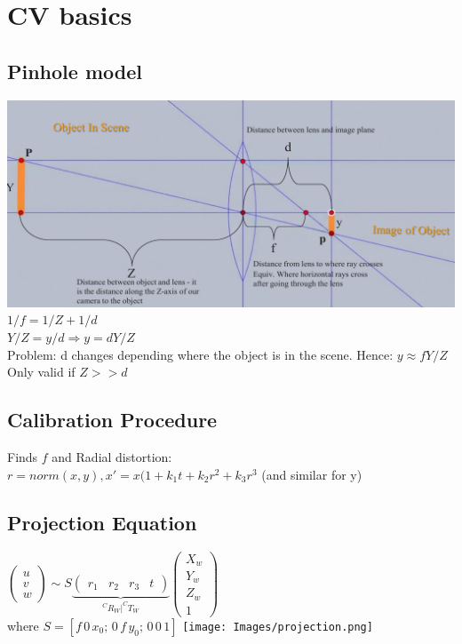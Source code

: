 \section{CV basics}
\subsection*{Pinhole model}
\includegraphics[width=\linewidth]{Images/Pinhole.png}
$1/f = 1/Z + 1/d$ \\
$Y/Z = y/d \Rightarrow y = d Y/Z$\\
Problem: d changes depending where the object is in the scene. Hence:
$y \approx f Y/Z$\\
\alert{Only valid if $Z >> d$}

\subsection*{Calibration Procedure}
Finds $f$ and Radial distortion:\\
$r = norm(x, y), x' = x( 1 + k_1 t + k_2 r^2
+ k_3 r^3$ (and similar for y)

\subsection*{Projection Equation}
$\begin{pmatrix} u\\ v\\ w\end{pmatrix} \sim
S \underbrace{\begin{pmatrix}r_1 & r_2 & r_3 & t \end{pmatrix}}_{^C R_W
| ^C T_W}
\begin{pmatrix} X_w \\ Y_w \\ Z_w \\ 1\end{pmatrix}$ \\
where $S = [f\,0\,x_0;\,0\,f\,y_0;\,0\,0\,1]$
\texttt{[image: Images/projection.png]}

